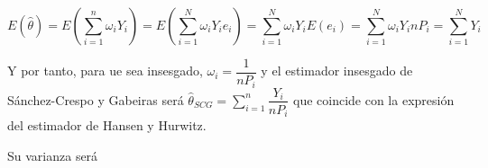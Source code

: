 \[
E\left(\hat{\theta}\right)=E\left(\sum_{i=1}^{n}\omega_{i}Y_{i}\right)=E\left(\sum_{i=1}^{N}\omega_{i}Y_{i}e_{i}\right)=\sum_{i=1}^{N}\omega_{i}Y_{i}E\left(e_{i}\right)=\sum_{i=1}^{N}\omega_{i}Y_{i}nP_{i}=\sum_{i=1}^{N}Y_{i}
\]


Y por tanto, para ue sea insesgado, $\omega_{i}=\dfrac{1}{nP_{i}}$
y el estimador insesgado de S\'anchez-Crespo y Gabeiras ser\'a $\hat{\theta}_{SCG}=\sum_{i=1}^{n}\dfrac{Y_{i}}{nP_{i}}$
que coincide con la expresi\'on del estimador de Hansen y Hurwitz.

Su varianza ser\'a 
